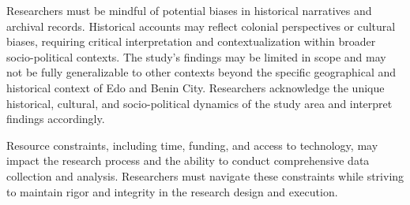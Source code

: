 Researchers must be mindful of potential biases in historical narratives and archival records. Historical accounts may reflect colonial perspectives or cultural biases, requiring critical interpretation and contextualization within broader socio-political contexts. The study's findings may be limited in scope and may not be fully generalizable to other contexts beyond the specific geographical and historical context of Edo and Benin City. Researchers acknowledge the unique historical, cultural, and socio-political dynamics of the study area and interpret findings accordingly.

Resource constraints, including time, funding, and access to technology, may impact the research process and the ability to conduct comprehensive data collection and analysis. Researchers must navigate these constraints while striving to maintain rigor and integrity in the research design and execution.
